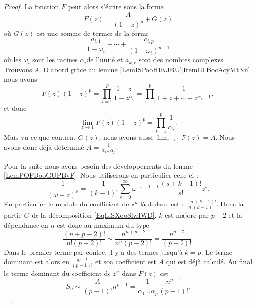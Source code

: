 \begin{proof}
    La fonction \( F\) peut alors s'écrire sous la forme
    \begin{equation}    \label{EqLISXooSlwIWD}
        F(z)=\frac{ A }{ (1-z)^p }+G(z)
    \end{equation}
    où \( G(z)\) est une somme de termes de la forme
    \begin{equation}
        \frac{ a_{i,1} }{ 1-\omega_i }+\cdots +\frac{ a_{i,p} }{ (1-\omega_i)^{p-1} }
    \end{equation}
    où les \( \omega_i\) sont les racines \( \alpha_i\)\ieme de l'unité et \( a_{k,r}\) sont des nombres complexes. Trouvons \( A\). D'abord grâce au lemme \ref{LemISPooHIKJBU}\ref{ItemLTBooAcyMtNii} nous avons
    \begin{equation}
        F(z)(1-z)^p=\prod_{l=1}^p\frac{ 1-z }{ 1-z^{\alpha_i} }=\prod_{i=1}^p\frac{ 1 }{ 1+z+\cdots +z^{\alpha_i-1} },
    \end{equation}
    et donc 
    \begin{equation}
        \lim_{z\to 1}F(z)(1-z)^p=\prod_{i=1}^p\frac{1}{ \alpha_i }.
    \end{equation}
    Mais vu ce que contient \( G(z)\), nous avons aussi \( \lim_{z\to 1}F(z)=A\). Nous avons donc déjà déterminé \( A=\frac{1}{  \alpha_1\ldots\alpha_p }\).

    Pour la suite nous avons besoin des développements du lemme \ref{LemPQFDooGUPBvF}. Nous utiliserons en particulier celle-ci :
    \begin{equation}
        \frac{1}{ (\omega-z)^k }=\frac{1}{ (k-1)! }\sum_{s=0}^{\infty}\omega^{-s-1-k}\frac{ (s+k-1)! }{ s! }z^s.
    \end{equation}
    En particulier le module du coefficient de \( z^n\) là dedans est : \(  \frac{(n+k-1)! }{ n!(k-1)! } \). Dans la partie \( G\) de la décomposition \eqref{EqLISXooSlwIWD}, \( k\) est majoré par \( p-2\) et la dépendance en \( n\) est donc au maximum du type
    \begin{equation}
        \frac{ (n+p-2)! }{ n!(p-2)! }\sim  \frac{ n^{n+p-2} }{ n^n(p-2)! }=\frac{ n^{p-2} }{ (p-2)! }.
    \end{equation}
    Dans le premier terme par contre, il y a des termes jusqu'à \( k=p\). Le terme dominant est alors en \( \frac{ n^{p-1} }{ (p-1)! }\) et son coefficient est \( A\) qui est déjà calculé. Au final le terme dominant du coefficient de \( z^n\) dans \( F(z)\) est
    \begin{equation}
        S_n\sim \frac{ A }{ (p-1)! }n^{p-1}=\frac{1}{ \alpha_1\ldots \alpha_p }\frac{ n^{p-1} }{ (p-1)! }.
    \end{equation}
\end{proof}

